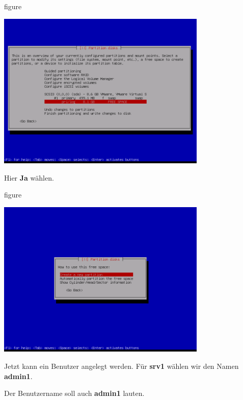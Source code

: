 \begin{nofloat}{figure}
\begin{center}
\includegraphics[width=0.75\textwidth]{screenshots/20_ubuntu_install.png}
\end{center}
\end{nofloat}

Hier \textbf{Ja} wählen.

\begin{nofloat}{figure}
\begin{center}
\includegraphics[width=0.75\textwidth]{screenshots/21_ubuntu_install.png}
\end{center}
\end{nofloat}

\pagebreak
Jetzt kann ein Benutzer angelegt werden. Für \textbf{srv1} wählen wir den Namen \textbf{admin1}.

Der Benutzername soll auch \textbf{admin1} lauten.

